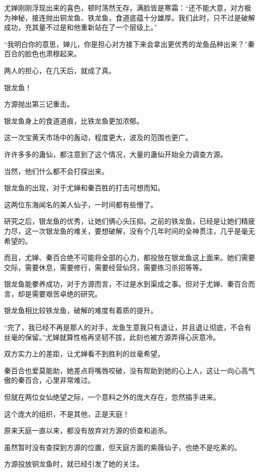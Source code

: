 \begin{this_body}
尤婵刚刚浮现出来的喜色，顿时荡然无存，满脸皆是寒霜：“还不能大意，对方极为神秘，接连抛出铜龙鱼、铁龙鱼，食道底蕴十分雄厚。我们此时，只不过是破解成功，充其量不过是和他重新站在了一个层级上。”

“我明白你的意思，婵儿，你是担心对方接下来会拿出更优秀的龙鱼品种出来？”秦百合的脸色也肃穆起来。

两人的担心，在几天后，就成了真。

银龙鱼！

方源抛出第三记重击。

银龙鱼身上的食道道痕，比铁龙鱼更加浓郁。

这一次宝黄天市场中的轰动，程度更大，波及的范围也更广。

许许多多的蛊仙，都注意到了这个情况，大量的蛊仙开始全力调查方源。

当然，他们什么都不会打探出来。

银龙鱼的出现，对于尤婵和秦百胜的打击可想而知。

这两位东海闻名的美人仙子，一时间都有些懵了。

研究之后，银龙鱼的优秀，让她们俩心头压抑。之前的铁龙鱼，已经是让她们精疲力尽，这一次银龙鱼的难关，要想破解，没有个几年时间的全神贯注，几乎是毫无希望的。

而且，尤婵、秦百合绝不可能将全部的心力，都投放在银龙鱼这上面来。她们需要交际，需要休息，需要修行，需要经营仙窍，需要练习杀招等等。

银龙鱼能豢养成功，对于方源而言，不过是水到渠成之事。但对于尤婵、秦百合而言，却是需要艰苦卓绝的研究。

银龙鱼相比较铁龙鱼，破解的难度有着质的提升。

“完了，我已经不再是那人的对手，龙鱼生意我只有退让，并且退让彻底，不会有丝毫的保留。”尤婵就算性格再坚韧不拔，此刻也被方源弄得心灰意冷。

双方实力上的差距，让尤婵看不到胜利的丝毫希望。

秦百合也爱莫能助，她差点将嘴唇咬破，没有帮助到她的心上人，这让一向心高气傲的秦百合，心里非常难过。

但就在两位女仙绝望之际，一个意料之外的庞大存在，忽然插手进来。

这个庞大的组织，不是其他，正是天庭！

原来天庭一直以来，都没有放弃对方源的侦查和追杀。

虽然暂时没有查探到方源的位置，但天庭方面的紫薇仙子，也绝不是吃素的。

方源投放铜龙鱼时，就已经引发了她的关注。


\end{this_body}
